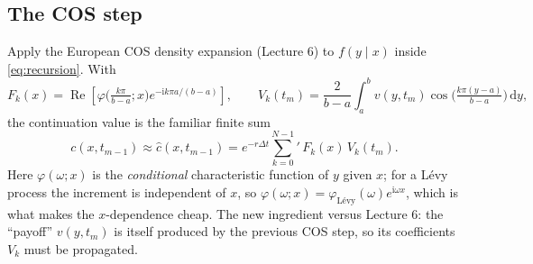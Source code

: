 \documentclass[11pt]{article}
\newcommand{\Real}{\operatorname{Re}}
\newcommand{\ii}{\mathrm{i}}
\newcommand{\dd}{\,\mathrm{d}}
\newcommand{\ch}{\varphi}
\begin{document}
\subsection{The COS step}
Apply the European COS density expansion (Lecture 6) to $f(y\mid x)$ inside \eqref{eq:recursion}. With
\[
F_k(x)=\Real\!\left[\ch\!\Big(\tfrac{k\pi}{b-a};x\Big)e^{-\ii k\pi a/(b-a)}\right],\qquad
V_k(t_m)=\frac{2}{b-a}\int_a^b v(y,t_m)\cos\!\Big(\tfrac{k\pi(y-a)}{b-a}\Big)\dd y,
\]
the continuation value is the familiar finite sum
\begin{equation}\label{eq:cosstep}
\boxed{\;c(x,t_{m-1})\approx \hat c(x,t_{m-1})=e^{-r\Delta t}{\sum_{k=0}^{N-1}}'\,F_k(x)\,V_k(t_m).\;}
\end{equation}
Here $\ch(\omega;x)$ is the \emph{conditional} characteristic function of $y$ given $x$; for a L\'evy process
the increment is independent of $x$, so $\ch(\omega;x)=\ch_{\text{L\'evy}}(\omega)e^{\ii\omega x}$, which is
what makes the $x$-dependence cheap. The new ingredient versus Lecture 6: the ``payoff'' $v(y,t_m)$ is itself
produced by the previous COS step, so its coefficients $V_k$ must be propagated.
\end{document}

